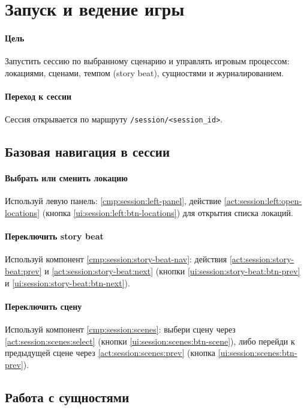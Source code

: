 \section{Запуск и ведение игры}\label{sec:standard-actions:run-game}

\paragraph{Цель}
Запустить сессию по выбранному сценарию и управлять игровым процессом: локациями, сценами, темпом (story beat), сущностями и журналированием. 

\paragraph{Переход к сессии}
Сессия открывается по маршруту \texttt{/session/<session\_id>}. 

\subsection{Базовая навигация в сессии}

\paragraph{Выбрать или сменить локацию}
Используй левую панель: \ref{cmp:session:left-panel}, действие \ref{act:session:left:open-locations} (кнопка \ref{ui:session:left:btn-locations}) для открытия списка локаций. 

\paragraph{Переключить story beat}
Используй компонент \ref{cmp:session:story-beat-nav}: действия \ref{act:session:story-beat:prev} и \ref{act:session:story-beat:next} (кнопки \ref{ui:session:story-beat:btn-prev} и \ref{ui:session:story-beat:btn-next}). 

\paragraph{Переключить сцену}
Используй компонент \ref{cmp:session:scenes}: выбери сцену через \ref{act:session:scenes:select} (кнопки \ref{ui:session:scenes:btn-scene}), либо перейди к предыдущей сцене через \ref{act:session:scenes:prev} (кнопка \ref{ui:session:scenes:btn-prev}). 

\subsection{Работа с сущностями}

